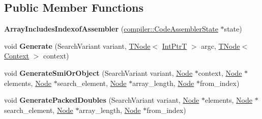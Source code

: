 \subsection*{Public Member Functions}
\begin{DoxyCompactItemize}
\item 
\mbox{\label{classv8_1_1internal_1_1ArrayIncludesIndexofAssembler_a8571755866b21c555d5e2c53bdc26748}} 
{\bfseries Array\+Includes\+Indexof\+Assembler} (\mbox{\hyperlink{classv8_1_1internal_1_1compiler_1_1CodeAssemblerState}{compiler\+::\+Code\+Assembler\+State}} $\ast$state)
\item 
\mbox{\label{classv8_1_1internal_1_1ArrayIncludesIndexofAssembler_a0d1590a6b57afe5545950aeab9555925}} 
void {\bfseries Generate} (Search\+Variant variant, \mbox{\hyperlink{classv8_1_1internal_1_1compiler_1_1TNode}{T\+Node}}$<$ \mbox{\hyperlink{structv8_1_1internal_1_1IntPtrT}{Int\+PtrT}} $>$ argc, \mbox{\hyperlink{classv8_1_1internal_1_1compiler_1_1TNode}{T\+Node}}$<$ \mbox{\hyperlink{classv8_1_1internal_1_1Context}{Context}} $>$ context)
\item 
\mbox{\label{classv8_1_1internal_1_1ArrayIncludesIndexofAssembler_a2b5e65d679c2570d0c1823b0d5205c16}} 
void {\bfseries Generate\+Smi\+Or\+Object} (Search\+Variant variant, \mbox{\hyperlink{classv8_1_1internal_1_1compiler_1_1Node}{Node}} $\ast$context, \mbox{\hyperlink{classv8_1_1internal_1_1compiler_1_1Node}{Node}} $\ast$elements, \mbox{\hyperlink{classv8_1_1internal_1_1compiler_1_1Node}{Node}} $\ast$search\+\_\+element, \mbox{\hyperlink{classv8_1_1internal_1_1compiler_1_1Node}{Node}} $\ast$array\+\_\+length, \mbox{\hyperlink{classv8_1_1internal_1_1compiler_1_1Node}{Node}} $\ast$from\+\_\+index)
\item 
\mbox{\label{classv8_1_1internal_1_1ArrayIncludesIndexofAssembler_a7bb9ca98b4163b732c575eb00c77c4df}} 
void {\bfseries Generate\+Packed\+Doubles} (Search\+Variant variant, \mbox{\hyperlink{classv8_1_1internal_1_1compiler_1_1Node}{Node}} $\ast$elements, \mbox{\hyperlink{classv8_1_1internal_1_1compiler_1_1Node}{Node}} $\ast$search\+\_\+element, \mbox{\hyperlink{classv8_1_1internal_1_1compiler_1_1Node}{Node}} $\ast$array\+\_\+length, \mbox{\hyperlink{classv8_1_1internal_1_1compiler_1_1Node}{Node}} $\ast$from\+\_\+index)

\end{DoxyCompactItemize}
